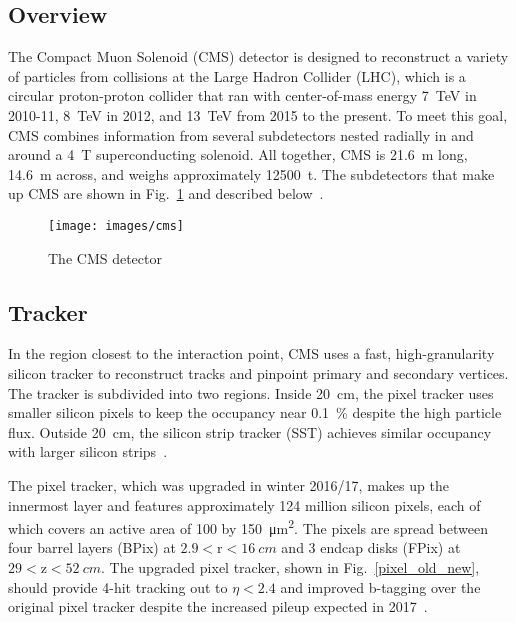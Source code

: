 \documentclass[12pt]{article}
\begin{document}
    \subsection{Overview}
        The Compact Muon Solenoid (CMS) detector is designed to reconstruct a variety of particles from collisions at the Large Hadron Collider (LHC), which is a circular proton-proton collider that ran with center-of-mass energy \SI{7}{\tera\electronvolt} in 2010-11, \SI{8}{\tera\electronvolt} in 2012, and \SI{13}{\tera\electronvolt} from 2015 to the present. To meet this goal, CMS combines information from several subdetectors nested radially in and around a \SI{4}{\tesla} superconducting solenoid. All together, CMS is \SI{21.6}{\m} long, \SI{14.6}{\m} across, and weighs approximately \SI{12500}{t}. The subdetectors that make up CMS are shown in Fig.~\ref{cms} and described below~\cite{cms_experiment}.

        \noindent \begin{figure}[htbp] \begin{center}
        \texttt{[image: images/cms]}
        \caption{The CMS detector~\cite{cms_image}}
        \label{cms}
        \end{center} \end{figure}

    \subsection{Tracker}
        In the region closest to the interaction point, CMS uses a fast, high-granularity silicon tracker to reconstruct tracks and pinpoint primary and secondary vertices. The tracker is subdivided into two regions. Inside \SI{20}{cm}, the pixel tracker  uses smaller silicon pixels to keep the occupancy near \SI{0.1}{\percent} despite the high particle flux. Outside \SI{20}{\cm}, the silicon strip tracker (SST) achieves similar occupancy with larger silicon strips~\cite{cms_tdr}.  

        The pixel tracker, which was upgraded in winter 2016/17, makes up the innermost layer and features approximately \num{124} million silicon pixels, each of which covers an active area of \num{100} by \SI{150}{\micro\meter^2}. The pixels are spread between four barrel layers (BPix) at $\num{2.9}<\mathrm{r}<\SI{16}{cm}$ and 3 endcap disks (FPix) at $\num{29} < \mathrm{z} < \SI{52}{cm}$. The upgraded pixel tracker, shown in Fig.~\ref{pixel_old_new}, should provide 4-hit tracking out to $\eta < \num{2.4}$ and improved b-tagging over the original pixel tracker despite the increased pileup expected in 2017~\cite{cms_pixel_upgrade}.
\end{document}
